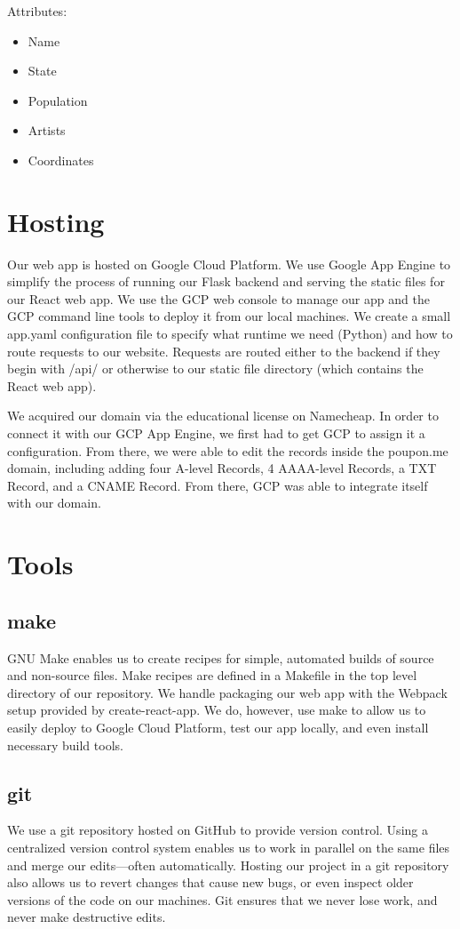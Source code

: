 \documentclass{scrartcl}
\begin{document}
Attributes:
\begin{itemize}
    \item Name
    \item State
    \item Population
    \item Artists
    \item Coordinates
\end{itemize}

\section{Hosting}
Our web app is hosted on Google Cloud Platform. We use Google App Engine to simplify the process of running our Flask backend and serving the static files for our React web app. We use the GCP web console to manage our app and the GCP command line tools to deploy it from our local machines. We create a small app.yaml configuration file to specify what runtime we need (Python) and how to route requests to our website. Requests are routed either to the backend if they begin with /api/ or otherwise to our static file directory (which contains the React web app).

We acquired our domain via the educational license on Namecheap. In order to connect it with our GCP App Engine, we first had to get GCP to assign it a configuration. From there, we were able to edit the records inside the poupon.me domain, including adding four A-level Records, 4 AAAA-level Records, a TXT Record, and a CNAME Record. From there, GCP was able to integrate itself with our domain.

\section{Tools}

\subsection{make}
GNU Make enables us to create recipes for simple, automated builds of source and non-source files. Make recipes are defined in a Makefile in the top level directory of our repository. We handle packaging our web app with the Webpack setup provided by create-react-app. We do, however, use make to allow us to easily deploy to Google Cloud Platform, test our app locally, and even install necessary build tools.

\subsection{git}
We use a git repository hosted on GitHub to provide version control. Using a centralized version control system enables us to work in parallel on the same files and merge our edits—often automatically. Hosting our project in a git repository also allows us to revert changes that cause new bugs, or even inspect older versions of the code on our machines. Git ensures that we never lose work, and never make destructive edits.
\end{document}
